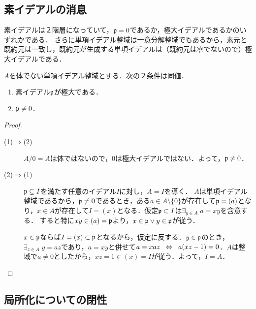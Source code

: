 \documentclass[uplatex,dvipdfmx]{jsreport}
\begin{document}
\subsection{素イデアルの消息}

\begin{tcolorbox}[colframe=ForestGreen, colback=ForestGreen!10!white,breakable,colbacktitle=ForestGreen!40!white,coltitle=black,fonttitle=\bfseries\sffamily,
title=]
    素イデアルは２階層になっていて，$\mathfrak{p}=0$であるか，極大イデアルであるかのいずれかである．
    さらに単項イデアル整域は一意分解整域でもあるから，素元と既約元は一致し，既約元が生成する単項イデアルは（既約元は零でないので）極大イデアルである．
\end{tcolorbox}

\begin{proposition}[PIDの極大イデアルの特徴付け]\label{prop-maximal-ideal-of-PID}
    $A$を体でない単項イデアル整域とする．次の２条件は同値．
    \begin{enumerate}
        \item 素イデアル$\mathfrak{p}$が極大である．
        \item $\mathfrak{p}\ne 0$．
    \end{enumerate}
\end{proposition}
\begin{proof}\mbox{}
    \begin{description}
        \item[(1)$\Rightarrow$(2)] $A/0=A$は体ではないので，$0$は極大イデアルではない．よって，$\mathfrak{p}\ne 0$．
        \item[(2)$\Rightarrow$(1)] $\mathfrak{p}\subsetneq I$を満たす任意のイデアル$I$に対し，$A=I$を導く．
        $A$は単項イデアル整域であるから，$\mathfrak{p}\ne 0$であるとき，ある$a\in A\setminus\{0\}$が存在して$\mathfrak{p}=(a)$となり，$x\in A$が存在して$I=(x)$となる．仮定$\mathfrak{p}\subset I$は$\exists_{y\in A}\; a=xy$を含意する．
        すると特に$xy\in(a)=\mathfrak{p}$より，$x\in\mathfrak{p}\lor y\in\mathfrak{p}$が従う．

        $x\in\mathfrak{p}$ならば$I=(x)\subset\mathfrak{p}$となるから，仮定に反する．$y\in\mathfrak{p}$のとき，$\exists_{z\in A}\;y=az$であり，$a=xy$と併せて$a=xaz\;\;\Leftrightarrow\;\; a(xz-1)=0$．$A$は整域で$a\ne 0$としたから，$xz=1\in(x)=I$が従う．よって，$I=A$．
    \end{description}
\end{proof}

\subsection{局所化についての閉性}
\end{document}
